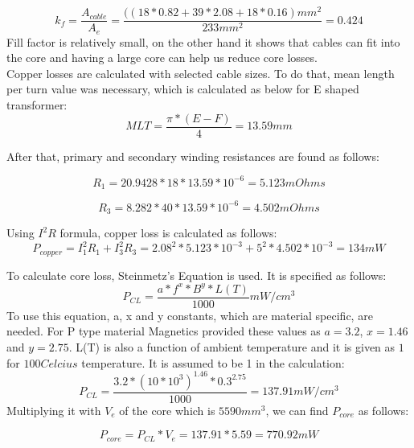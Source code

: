 \documentclass{article}
\newcommand\tab[1][1cm]{\hspace*{#1}}
\begin{document}
\begin{equation*}
    k_f=\frac{A_{cable}}{A_e}=\frac{((18*0.82+39*2.08+18*0.16) mm^2}{233 mm^2}=0.424
\end{equation*}
Fill factor is relatively small, on the other hand it shows that cables can fit into the core and having a large core can help us reduce core losses. \\
\tab Copper losses are calculated with selected cable sizes. To do that, mean length per turn value was necessary, which is calculated as below for E shaped transformer:
\begin{equation*}
    MLT=\frac{ \pi*(E-F)}{4}= 13.59 mm
\end{equation*}

After that, primary and secondary winding resistances are found as follows:

\begin{equation*}
    R_{1}=20.9428*18*13.59*10^{-6}=5.123 mOhms
\end{equation*}

\begin{equation*}
    R_{3}=8.282*40*13.59*10^{-6}=4.502 mOhms
\end{equation*}

Using $I^2R$ formula, copper loss is calculated as follows:
\begin{equation*}
    P_{copper}=I_1^2R_1+I_3^2R_3=2.08^2*5.123*10^{-3}+5^2*4.502*10^{-3}=134 mW
\end{equation*}

\tab To calculate core loss, Steinmetz's Equation is used. It is specified as follows:
\begin{equation*}
    P_{CL}=\frac{a*f^x*B^y*L(T)}{1000} mW/cm^3
\end{equation*}
\tab To use this equation, a, x and y constants, which are material specific, are needed. For P type material Magnetics provided these values as $a=3.2$, $x=1.46$ and $y=2.75$. L(T) is also a function of ambient temperature and it is given as $1$ for $100 Celcius$ temperature. It is assumed to be 1 in the calculation:
\begin{equation*}
     P_{CL}=\frac{3.2*(10*10^3)^{1.46}*0.3^2.75}{1000}=137.91 mW/cm^3
\end{equation*}
Multiplying it with $V_e$ of the core which is $5590 mm^3$, we can find $P_{core}$ as follows:

\begin{equation*}
   P_{core}=P_{CL}*V_e=137.91*5.59=770.92 mW
\end{equation*}
\end{document}
